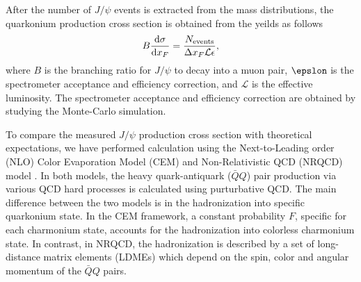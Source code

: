 \documentclass[10pt, a4paper,final]{article}
\begin{document}
After the number of $J/\psi$ events is extracted from the mass distributions,
the quarkonium production cross section is obtained from the yeilds as follows
\begin{equation}
	B\dv{\sigma}{x_F} = \frac{N_{\textrm{events}}}{\Delta x_F \mathcal{L} \epsilon},
\end{equation}
where $B$ is the branching ratio for $J/\psi$ to decay into a muon pair,
$\epslon$ is the spectrometer acceptance and efficiency correction, and
$\mathcal{L}$ is the effective luminosity. The spectrometer acceptance and
efficiency correction are obtained by studying the Monte-Carlo simulation.

To compare the measured $J/\psi$ production cross section with theoretical
expectations, we have performed calculation using the Next-to-Leading
order (NLO) Color Evaporation Model (CEM)\cite{mangano1993} and
Non-Relativistic QCD (NRQCD) model \cite{bodwin1997}. In both models, the heavy
quark-antiquark ($\bar{Q}Q$) pair production via various QCD hard processes
is calculated using purturbative QCD. The main difference between the two
models is in the hadronization into specific quarkonium state.
In the CEM framework, a constant probability $F$, specific for each charmonium
state, accounts for the hadronization into colorless charmonium state. In contrast,
in NRQCD, the hadronization is described by a set of long-distance matrix elements
(LDMEs) which depend on the spin, color and angular momentum of the $\bar{Q}Q$ pairs.
\end{document}
